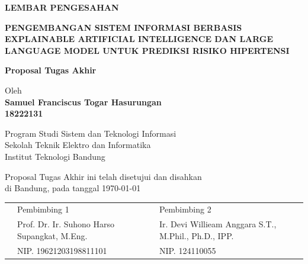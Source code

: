 \documentclass[12pt,a4paper,oneside]{book}
\begin{document}
\newpage
\thispagestyle{empty}
\begin{center}
  \textbf{\large LEMBAR PENGESAHAN}\\[1cm]
  \vspace*{1.5cm}
    
  {\large\bfseries PENGEMBANGAN SISTEM INFORMASI BERBASIS EXPLAINABLE ARTIFICIAL INTELLIGENCE DAN LARGE LANGUAGE MODEL UNTUK PREDIKSI RISIKO HIPERTENSI}\\
     \vspace{2cm}

  {\Large \textbf{Proposal Tugas Akhir}}\\

  \vspace{1.5cm}
  
  {\large Oleh}\\[0.3cm]
    \textbf{
    {\large Samuel Franciscus Togar Hasurungan}\\
    {\large 18222131}
  }\\
    
  \vspace{0.5cm}
 
  {\large Program Studi Sistem dan Teknologi Informasi}\\
  {\large Sekolah Teknik Elektro dan Informatika}\\
  {\large Institut Teknologi Bandung}\\

  \vspace{1.5cm}

  Proposal Tugas Akhir ini telah disetujui dan disahkan\\ 
  di Bandung, pada tanggal \today\\[1cm]

\begin{tabular}{p{1cm}p{7cm}p{7cm}}
  & Pembimbing 1 & Pembimbing 2 \\[3cm]
  & Prof. Dr. Ir. Suhono Harso Supangkat, M.Eng. & Ir. Devi Willieam Anggara S.T., M.Phil., Ph.D., IPP. \\[0.2cm]
  & NIP. 19621203198811101 & NIP. 124110055
\end{tabular}

\end{center}
\end{document}

